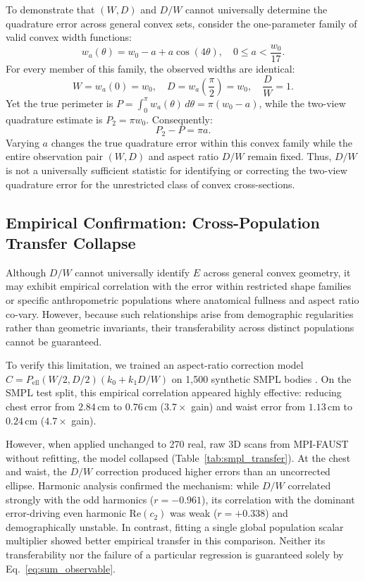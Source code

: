 \documentclass[journal]{IEEEtran}
\begin{document}
To demonstrate that $(W, D)$ and $D/W$ cannot universally determine the quadrature error across general convex sets, consider the one-parameter family of valid convex width functions:
\begin{equation}
w_a(\theta) = w_0 - a + a\cos(4\theta), \quad 0 \le a < \frac{w_0}{17}.
\label{eq:counterexample}
\end{equation}
For every member of this family, the observed widths are identical:
\begin{equation}
W = w_a(0) = w_0, \quad D = w_a\left(\frac{\pi}{2}\right) = w_0, \quad \frac{D}{W} = 1.
\end{equation}
Yet the true perimeter is $P = \int_0^\pi w_a(\theta)\,d\theta = \pi(w_0 - a)$, while the two-view quadrature estimate is $P_2 = \pi w_0$. Consequently:
\begin{equation}
P_2 - P = \pi a.
\label{eq:counterexample_error}
\end{equation}
Varying $a$ changes the true quadrature error within this convex family while the entire observation pair $(W, D)$ and aspect ratio $D/W$ remain fixed. Thus, $D/W$ is not a universally sufficient statistic for identifying or correcting the two-view quadrature error for the unrestricted class of convex cross-sections.

\subsection{Empirical Confirmation: Cross-Population Transfer Collapse}
Although $D/W$ cannot universally identify $E$ across general convex geometry, it may exhibit empirical correlation with the error within restricted shape families or specific anthropometric populations where anatomical fullness and aspect ratio co-vary. However, because such relationships arise from demographic regularities rather than geometric invariants, their transferability across distinct populations cannot be guaranteed.

To verify this limitation, we trained an aspect-ratio correction model $C = P_{\text{ell}}(W/2, D/2)(k_0 + k_1 D/W)$ on 1,500 synthetic SMPL bodies \cite{loper2015smpl}. On the SMPL test split, this empirical correlation appeared highly effective: reducing chest error from $2.84$\,cm to $0.76$\,cm ($3.7\times$ gain) and waist error from $1.13$\,cm to $0.24$\,cm ($4.7\times$ gain).

However, when applied unchanged to 270 real, raw 3D scans from MPI-FAUST \cite{bogo2014faust} without refitting, the model collapsed (Table~\ref{tab:smpl_transfer}). At the chest and waist, the $D/W$ correction produced higher errors than an uncorrected ellipse. Harmonic analysis confirmed the mechanism: while $D/W$ correlated strongly with the odd harmonics ($r = -0.961$), its correlation with the dominant error-driving even harmonic $\text{Re}(c_2)$ was weak ($r = +0.338$) and demographically unstable. In contrast, fitting a single global population scalar multiplier showed better empirical transfer in this comparison. Neither its transferability nor the failure of a particular regression is guaranteed solely by Eq.~\eqref{eq:sum_observable}.
\end{document}
